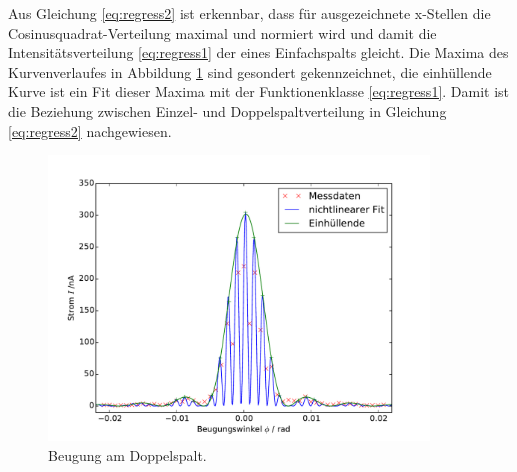 Aus Gleichung \eqref{eq:regress2} ist erkennbar, dass für ausgezeichnete x-Stellen die Cosinusquadrat-Verteilung maximal und normiert wird und damit  die Intensitätsverteilung \eqref{eq:regress1} der eines Einfachspalts gleicht.
Die Maxima des Kurvenverlaufes in Abbildung \ref{fig:m3} sind gesondert gekennzeichnet, die einhüllende Kurve ist ein Fit dieser Maxima mit der Funktionenklasse \eqref{eq:regress1}.
Damit ist die Beziehung zwischen Einzel- und Doppelspaltverteilung in Gleichung \eqref{eq:regress2} nachgewiesen.

\begin{figure}
\centering
	\includegraphics[width=0.9\textwidth]{Bilder/Messung3.pdf}
	\caption{Beugung am Doppelspalt.}
\label{fig:m3}
\end{figure}


